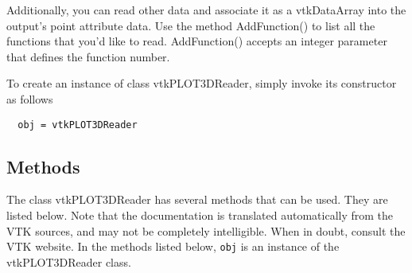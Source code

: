  Additionally, you can read other data and associate it as a vtkDataArray
 into the output's point attribute data. Use the method AddFunction()
 to list all the functions that you'd like to read. AddFunction() accepts
 an integer parameter that defines the function number.


To create an instance of class vtkPLOT3DReader, simply
invoke its constructor as follows
\begin{verbatim}
  obj = vtkPLOT3DReader
\end{verbatim}
\subsection{Methods}

The class vtkPLOT3DReader has several methods that can be used.
  They are listed below.
Note that the documentation is translated automatically from the VTK sources,
and may not be completely intelligible.  When in doubt, consult the VTK website.
In the methods listed below, \verb|obj| is an instance of the vtkPLOT3DReader class.
